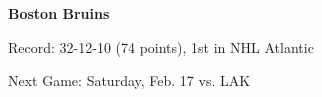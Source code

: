 \textbf{Boston Bruins}

Record: 32-12-10 (74 points), 1st in NHL Atlantic 

Next Game: Saturday, Feb. 17 vs. LAK